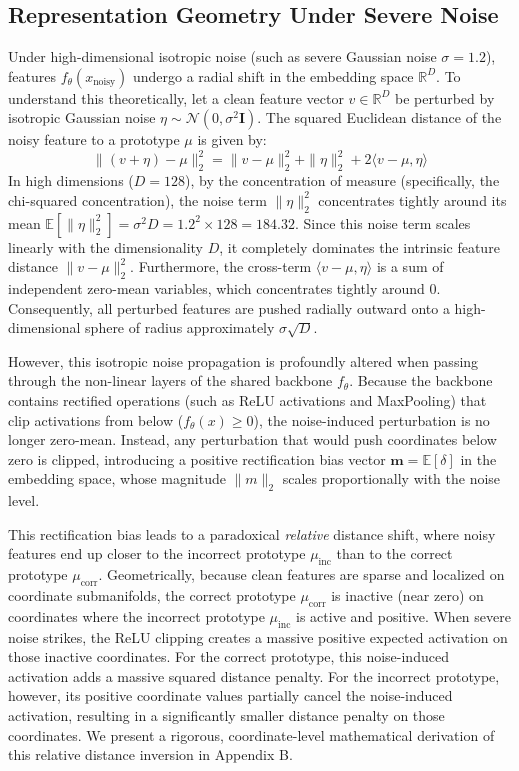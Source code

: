 \documentclass{article}
\theoremstyle{plain}
\theoremstyle{definition}
\theoremstyle{remark}
\begin{document}
\subsection{Representation Geometry Under Severe Noise}
Under high-dimensional isotropic noise (such as severe Gaussian noise $\sigma=1.2$), features $f_\theta(x_{\text{noisy}})$ undergo a radial shift in the embedding space $\mathbb{R}^D$. To understand this theoretically, let a clean feature vector $v \in \mathbb{R}^D$ be perturbed by isotropic Gaussian noise $\eta \sim \mathcal{N}(0, \sigma^2 \mathbf{I})$. The squared Euclidean distance of the noisy feature to a prototype $\mu$ is given by:
\begin{equation}
    \|(v + \eta) - \mu\|_2^2 = \|v - \mu\|_2^2 + \|\eta\|_2^2 + 2\langle v - \mu, \eta \rangle
\end{equation}
In high dimensions ($D=128$), by the concentration of measure (specifically, the chi-squared concentration), the noise term $\|\eta\|_2^2$ concentrates tightly around its mean $\mathbb{E}[\|\eta\|_2^2] = \sigma^2 D = 1.2^2 \times 128 = 184.32$. Since this noise term scales linearly with the dimensionality $D$, it completely dominates the intrinsic feature distance $\|v - \mu\|_2^2$. Furthermore, the cross-term $\langle v - \mu, \eta \rangle$ is a sum of independent zero-mean variables, which concentrates tightly around 0. Consequently, all perturbed features are pushed radially outward onto a high-dimensional sphere of radius approximately $\sigma\sqrt{D}$.

However, this isotropic noise propagation is profoundly altered when passing through the non-linear layers of the shared backbone $f_\theta$. Because the backbone contains rectified operations (such as ReLU activations and MaxPooling) that clip activations from below ($f_\theta(x) \ge 0$), the noise-induced perturbation is no longer zero-mean. Instead, any perturbation that would push coordinates below zero is clipped, introducing a positive rectification bias vector $\mathbf{m} = \mathbb{E}[\delta]$ in the embedding space, whose magnitude $\|m\|_2$ scales proportionally with the noise level.

This rectification bias leads to a paradoxical \textit{relative} distance shift, where noisy features end up closer to the incorrect prototype $\mu_{\text{inc}}$ than to the correct prototype $\mu_{\text{corr}}$. Geometrically, because clean features are sparse and localized on coordinate submanifolds, the correct prototype $\mu_{\text{corr}}$ is inactive (near zero) on coordinates where the incorrect prototype $\mu_{\text{inc}}$ is active and positive. When severe noise strikes, the ReLU clipping creates a massive positive expected activation on those inactive coordinates. For the correct prototype, this noise-induced activation adds a massive squared distance penalty. For the incorrect prototype, however, its positive coordinate values partially cancel the noise-induced activation, resulting in a significantly smaller distance penalty on those coordinates. We present a rigorous, coordinate-level mathematical derivation of this relative distance inversion in Appendix B.
\end{document}
